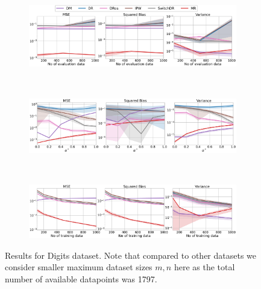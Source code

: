 \begin{figure}[h!]
    \centering
	\begin{subfigure}{0.8\textwidth}
	    \centering
	    \includegraphics[width=1\textwidth]{figures/mr/multiclass/ope_vs_n_alphatar_0_2_digits_ntr500.png}
	    \label{subfig:digits-neval}
	\end{subfigure}\\
	\begin{subfigure}{0.8\textwidth} 
	    \centering
	    \includegraphics[width=1\textwidth]{figures/mr/multiclass/ope_vs_alphatar_neval_500_digits_ntr_1000.png}
	    \label{subfig:digits-ae}
	\end{subfigure}\\
 	\begin{subfigure}{0.8\textwidth} 
	    \centering
	    \includegraphics[width=1\textwidth]{figures/mr/multiclass/ope_vs_ntr_neval_500_digits_alpha_0_6.png}
	    \label{subfig:digits-tr}
	\end{subfigure}
    \caption{Results for Digits dataset. Note that compared to other datasets we consider smaller maximum dataset sizes $m,n$ here as the total number of available datapoints was 1797.}
    \label{fig:digits}
\end{figure}

